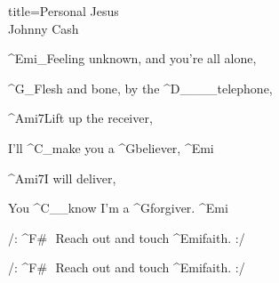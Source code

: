 \begin{song}{title=\centering Personal Jesus \\\normalsize Johnny Cash  \vspace*{-0.3cm}}
{\begin{minipage}[t]{0.48\textwidth}
\sloka
	^{Emi{\color{white}\_}}Feeling unknown, and you're all alone,

	^{G{\color{white}\_}}Flesh and bone, by the ^{D{\color{white}\_\_\_\_}}telephone,

	^{Ami7}Lift up the receiver,

	I'll ^{C{\color{white}\_}}make you a ^{G}believer, ^{Emi}

	^{Ami7}I will deliver,
	
	You ^{C{\color{white}\_\_}}know I'm a ^{G}forgiver. ^{Emi}


	/: ^{F\#\,\,\,\,}Reach out and touch ^{Emi}faith. :/
	
	/: ^{F\#\,\,\,\,}Reach out and touch ^{Emi}faith. :/

\end{minipage}
}
\setcounter{Slokočet}{0}
\end{song}	